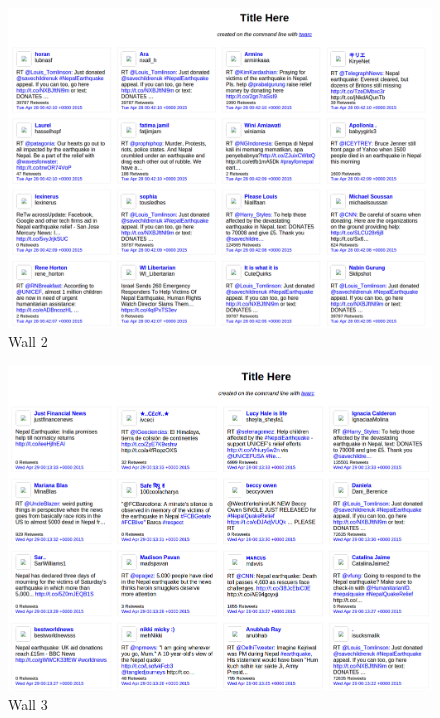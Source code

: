 \begin{enumerate}
\newpage
\begin{figure}[ht]    
    \begin{center}
        \includegraphics[scale=0.40]{graphs/wall2.png}
        \caption{Wall 2}
    \end{center}
\end{figure}

\newpage
\begin{figure}[ht]    
    \begin{center}
        \includegraphics[scale=0.40]{graphs/wall3.png}
        \caption{Wall 3}
    \end{center}
\end{figure}


\end{enumerate}
